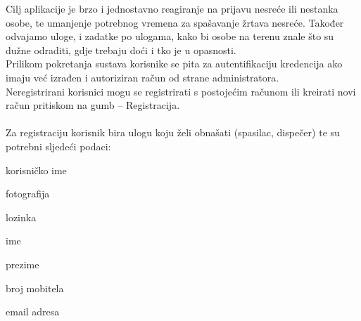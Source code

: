 {			Cilj aplikacije je brzo i jednostavno reagiranje na prijavu nesreće ili nestanka osobe, te umanjenje potrebnog vremena za spašavanje žrtava nesreće. Također odvajamo uloge, i zadatke po ulogama, kako bi osobe na terenu znale što su dužne odraditi, gdje trebaju doći i tko je u opasnosti.\\
		Prilikom pokretanja sustava korisnike se pita za autentifikaciju kredencija ako imaju već izrađen i autoriziran račun od strane administratora.\\
		Neregistrirani korisnici mogu se registrirati s postojećim računom ili kreirati novi račun pritiskom na gumb – Registracija. 
		\\\\Za registraciju korisnik bira ulogu koju želi obnašati (spasilac, dispečer) te su potrebni sljedeći podaci:}


		\begin{packed_item}
			\item {korisničko ime} 
			\item {fotografija}
			\item {lozinka}
			\item {ime}
			\item {prezime}
			\item {broj mobitela}
			\item {email adresa}
		\end{packed_item}
	

